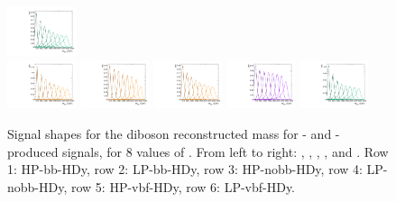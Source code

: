 \begin{figure}[htbp]
  \includegraphics[width=0.18\textwidth]{fig/analysis/templateSignalVsMX_fromDC_WprToWH_MVV_mu_HP_vbf_DEtaHi.pdf}\\
  \includegraphics[width=0.18\textwidth]{fig/analysis/templateSignalVsMX_fromDC_GbuToWW_MVV_mu_LP_vbf_DEtaHi.pdf}
  \includegraphics[width=0.18\textwidth]{fig/analysis/templateSignalVsMX_fromDC_RadToWW_MVV_mu_LP_vbf_DEtaHi.pdf}
  \includegraphics[width=0.18\textwidth]{fig/analysis/templateSignalVsMX_fromDC_ZprToWW_MVV_mu_LP_vbf_DEtaHi.pdf}
  \includegraphics[width=0.18\textwidth]{fig/analysis/templateSignalVsMX_fromDC_WprToWZ_MVV_mu_LP_vbf_DEtaHi.pdf}
  \includegraphics[width=0.18\textwidth]{fig/analysis/templateSignalVsMX_fromDC_WprToWH_MVV_mu_LP_vbf_DEtaHi.pdf}\\
  \caption{
    Signal shapes for the diboson reconstructed mass \MVV for \ggF- and \DY-produced signals, for 8 values of \MX.
    From left to right: \GBulktoWW, \RadtoWW, \ZprtoWW, \WprtoWZ, and \WprtoWH.
    Row 1: HP-bb-HDy, row 2: LP-bb-HDy, row 3: HP-nobb-HDy, row 4: LP-nobb-HDy, row 5: HP-vbf-HDy, row 6: LP-vbf-HDy.
  }
  \label{fig:MVVShapes_NonVBF_HDy_Run2}
\end{figure}

